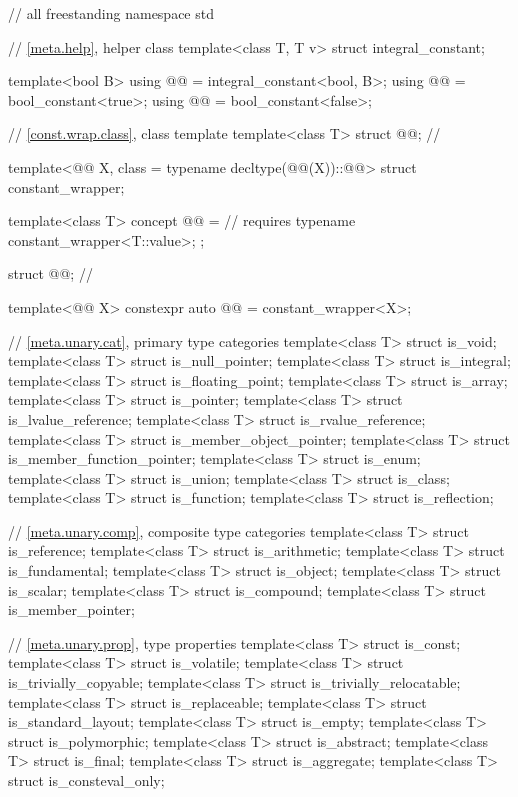 %
\begin{codeblock}
// all freestanding
namespace std {
  // \ref{meta.help}, helper class
  template<class T, T v> struct integral_constant;

  template<bool B>
    using @@ = integral_constant<bool, B>;
  using @@  = bool_constant<true>;
  using @@ = bool_constant<false>;

  // \ref{const.wrap.class}, class template 
  template<class T>
    struct @@;                                      // \expos

  template<@@ X, class = typename decltype(@@(X))::@@>
    struct constant_wrapper;

  template<class T>
    concept @@ =                                   // \expos
      requires { typename constant_wrapper<T::value>; };

  struct @@;                                          // \expos

  template<@@ X>
    constexpr auto @@ = constant_wrapper<X>{};

  // \ref{meta.unary.cat}, primary type categories
  template<class T> struct is_void;
  template<class T> struct is_null_pointer;
  template<class T> struct is_integral;
  template<class T> struct is_floating_point;
  template<class T> struct is_array;
  template<class T> struct is_pointer;
  template<class T> struct is_lvalue_reference;
  template<class T> struct is_rvalue_reference;
  template<class T> struct is_member_object_pointer;
  template<class T> struct is_member_function_pointer;
  template<class T> struct is_enum;
  template<class T> struct is_union;
  template<class T> struct is_class;
  template<class T> struct is_function;
  template<class T> struct is_reflection;

  // \ref{meta.unary.comp}, composite type categories
  template<class T> struct is_reference;
  template<class T> struct is_arithmetic;
  template<class T> struct is_fundamental;
  template<class T> struct is_object;
  template<class T> struct is_scalar;
  template<class T> struct is_compound;
  template<class T> struct is_member_pointer;

  // \ref{meta.unary.prop}, type properties
  template<class T> struct is_const;
  template<class T> struct is_volatile;
  template<class T> struct is_trivially_copyable;
  template<class T> struct is_trivially_relocatable;
  template<class T> struct is_replaceable;
  template<class T> struct is_standard_layout;
  template<class T> struct is_empty;
  template<class T> struct is_polymorphic;
  template<class T> struct is_abstract;
  template<class T> struct is_final;
  template<class T> struct is_aggregate;
  template<class T> struct is_consteval_only;

}
\end{codeblock}

